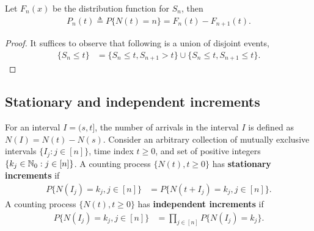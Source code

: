 \documentclass[a4paper,10pt,english]{article}
\begin{document}
\begin{lem}
Let $F_n(x)$ be the distribution function for $S_n$, then 
\begin{align*}
P_n(t) \triangleq P\{N(t) = n\} = F_{n}(t)-F_{n+1}(t).
\end{align*}
\end{lem}
\begin{proof} It suffices to observe that following is a union of disjoint events,
\begin{align*}
\{S_n \leqslant t \} &= \{S_n \leqslant t, S_{n+1} > t\} \cup \{S_{n} \leqslant t, S_{n+1} \leqslant t\}.
\end{align*}
\end{proof}

\subsection{Stationary and independent increments}
For an interval $I = (s,t]$, the number of arrivals in the interval $I$ is defined as $N(I) = N(t) - N(s)$. 
Consider an arbitrary collection of mutually exclusive intervals $\{I_j: j \in [n]\}$, time index $t \geqslant 0$, and set of positive integers $\{k_j \in \mathbb{N}_0 : j \in [n]\}$. 
A counting process $\{N(t), t\geqslant 0\}$ has \textbf{stationary increments} if
\begin{align*}
P\{N(I_j) = k_j, j \in [n]\} &= P\{N(t + I_j) = k_j, j \in [n]\}.
\end{align*}
A counting process $\{N(t), t\geqslant 0\}$ has \textbf{independent increments} if %
\begin{align*}
P\{N(I_j) = k_j, j \in [n]\} &= \prod_{j \in [n]}P\{N(I_j) = k_j\}.
\end{align*}
\end{document}
